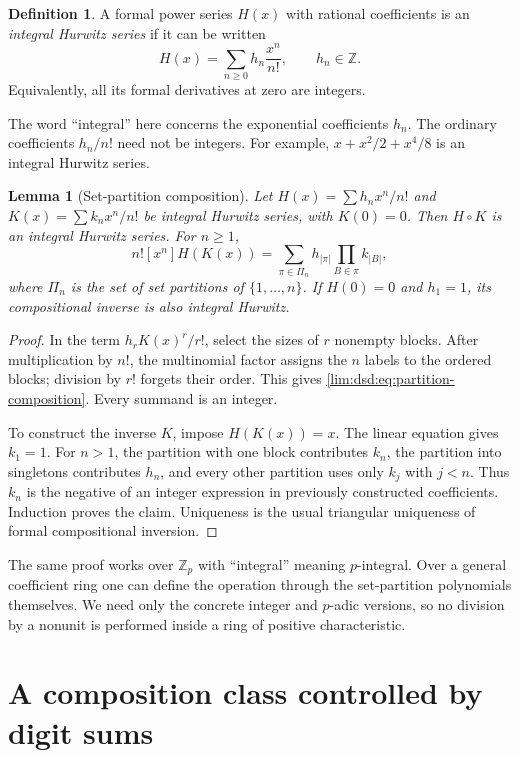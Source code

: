 \documentclass[11pt]{article}
\newtheorem{lemma}[theorem]{Lemma}
\theoremstyle{definition}
\newtheorem{definition}[theorem]{Definition}
\theoremstyle{remark}
\newcommand{\Z}{\mathbb Z}
\begin{document}
\begin{definition}
A formal power series $H(x)$ with rational coefficients is an \emph{integral Hurwitz series}
if it can be written
\[
 H(x)=\sum_{n\ge0}h_n\frac{x^n}{n!},\qquad h_n\in\Z.
\]
Equivalently, all its formal derivatives at zero are integers.
\end{definition}

The word ``integral'' here concerns the exponential coefficients $h_n$.
The ordinary coefficients $h_n/n!$ need not be integers. For example,
$x+x^2/2+x^4/8$ is an integral Hurwitz series.

\begin{lemma}[Set-partition composition]
\label{lim:dsd:lem:bell}
Let $H(x)=\sum h_nx^n/n!$ and $K(x)=\sum k_nx^n/n!$ be integral
Hurwitz series, with $K(0)=0$. Then $H\circ K$ is an integral Hurwitz
series. For $n\ge1$,
\begin{equation}
 n![x^n]H(K(x))
 =\sum_{\pi\in\Pi_n}h_{|\pi|}\prod_{B\in\pi}k_{|B|},
 \label{lim:dsd:eq:partition-composition}
\end{equation}
where $\Pi_n$ is the set of set partitions of $\{1,\ldots,n\}$.
If $H(0)=0$ and $h_1=1$, its compositional inverse is also integral
Hurwitz.
\end{lemma}
\begin{proof}
In the term $h_rK(x)^r/r!$, select the sizes of $r$ nonempty blocks.
After multiplication by $n!$, the multinomial factor assigns the $n$
labels to the ordered blocks; division by $r!$ forgets their order.
This gives \eqref{lim:dsd:eq:partition-composition}. Every summand is an integer.

To construct the inverse $K$, impose $H(K(x))=x$. The linear equation
gives $k_1=1$. For $n>1$, the partition with one block contributes
$k_n$, the partition into singletons contributes $h_n$, and every
other partition uses only $k_j$ with $j<n$. Thus $k_n$ is the negative
of an integer expression in previously constructed coefficients.
Induction proves the claim. Uniqueness is the usual triangular
uniqueness of formal compositional inversion.
\end{proof}

The same proof works over $\Z_p$ with ``integral'' meaning $p$-integral.
Over a general coefficient ring one can define the operation through
the set-partition polynomials themselves. We need only the concrete
integer and $p$-adic versions, so no division by a nonunit is performed
inside a ring of positive characteristic.

\section{A composition class controlled by digit sums}
\label{lim:dsd:sec:class}
\end{document}
